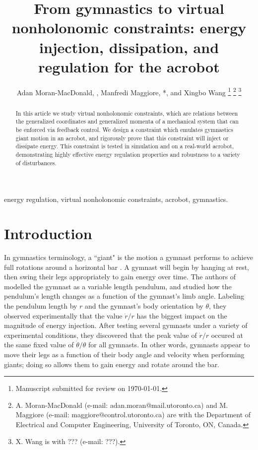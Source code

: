 \documentclass[journal,twoside,web, twocolumn,draftcls]{ieeecolor}
\newcommand*{\Title}{From gymnastics to virtual nonholonomic constraints: energy
injection, dissipation, and regulation for the acrobot}
\begin{document}
\title{\Title}
\author{Adan Moran-MacDonald, , Manfredi Maggiore,
*, and Xingbo Wang
\thanks{Manuscript submitted for review on \today.}
\thanks{A. Moran-MacDonald (e-mail: adan.moran@mail.utoronto.ca) and
M. Maggiore (e-mail: maggiore@control.utoronto.ca) are with the Department of
Electrical and Computer Engineering, University of Toronto, ON, Canada.}
\thanks{X. Wang is with ??? (e-mail: ???).}
} %

\maketitle

\begin{abstract}
    In this article we study virtual nonholonomic constraints, which are
    relations between the generalized coordinates and generalized momenta of a
    mechanical system that can be enforced via feedback control.
    We design a constraint which emulates gymnastics giant motion in an
    acrobot, and rigorously prove that this constraint will inject or dissipate
    energy.
    This constraint is tested in simulation and on a real-world acrobot,
    demonstrating highly effective energy regulation properties and robustness
    to a variety of disturbances.
\end{abstract}

\begin{IEEEkeywords}
    energy regulation, virtual nonholonomic constraints, acrobot, gymnastics.
\end{IEEEkeywords}

\section{Introduction}\label{sec:introduction}

In gymnastics terminology, a ``giant" is the motion a gymnast performs to
achieve full rotations around a horizontal bar \cite{usagym_giant}. 
A gymnast will begin by hanging at rest, then swing their legs
appropriately to gain energy over time.
The authors of \cite{pendulum_length_giant_gymnastics} modelled the gymnast as a
variable length pendulum, and studied how the pendulum's length changes as a
function of the gymnast's limb angle.
Labeling the pendulum length by \(r\) and the gymnast's body orientation
by \(\theta\), they observed experimentally that the value \(\dot{r}/r\) has
the biggest impact on the magnitude of energy injection. 
After testing several gymnasts under a variety of experimental conditions, 
they discovered that the peak value of \(\dot{r}/r\) occured at the same fixed
value of \(\dot{\theta}/\theta\) for all gymnasts.
In other words, gymnasts appear to move their legs as a function of their body
angle and velocity when performing giants; 
doing so allows them to gain energy and rotate around the bar.
\end{document}
